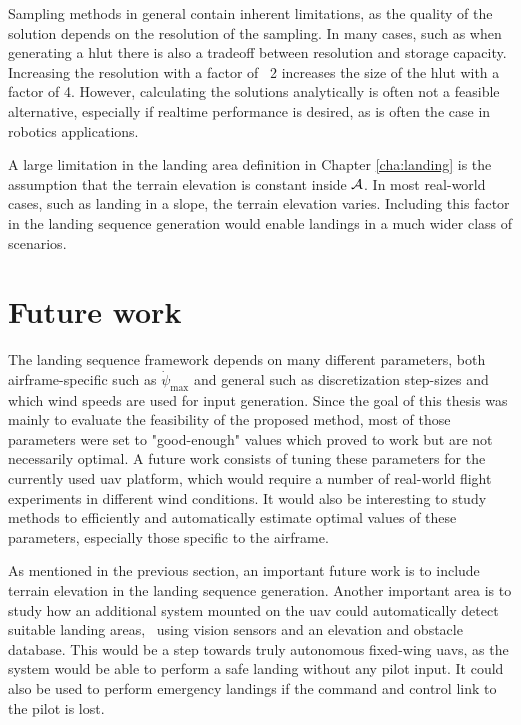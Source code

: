 Sampling methods in general contain inherent limitations, as the 
quality of the solution depends on the resolution of the sampling. In many cases, such as when generating a \ac{hlut} there is also a tradeoff between resolution and storage capacity. Increasing the resolution 
with a factor of \eg\ 2 increases the size of the \ac{hlut} with a factor of 4. However, calculating the solutions analytically is often not a feasible alternative, especially if realtime performance is desired, as is 
often the case in robotics applications.

A large limitation in the landing area definition in Chapter \ref{cha:landing} is the assumption that the terrain elevation is constant inside $\mathcal{A}$. In 
most real-world cases, such as landing in a slope, the terrain elevation varies. Including this factor in the landing sequence generation would enable landings in a much wider class of scenarios.

\section{Future work}
The landing sequence framework depends on many different parameters, both airframe-specific such as $\dot{\psi}_{\text{max}}$ and general such as discretization step-sizes and which wind speeds are used for input generation.
Since the goal of this thesis was mainly to evaluate the feasibility of the proposed method, most of those parameters were set to "good-enough" values which proved to work but are not necessarily optimal. 
A future work consists of tuning these parameters for the currently used \ac{uav} platform, which would require a number of real-world flight experiments in different wind conditions.
It would also be interesting to study methods to efficiently and automatically estimate optimal values of these parameters, especially those specific to the airframe.

As mentioned in the previous section, an important future work is to include terrain elevation in the landing sequence generation. Another important area is to 
study how an additional system mounted on the \ac{uav} could automatically detect suitable landing areas, \eg\ using vision sensors and an elevation and obstacle database. 
This would be a step towards truly autonomous fixed-wing \acp{uav}, as the system would be able to perform a safe landing without any pilot input. It could also be used to perform 
emergency landings if the command and control link to the pilot is lost.
